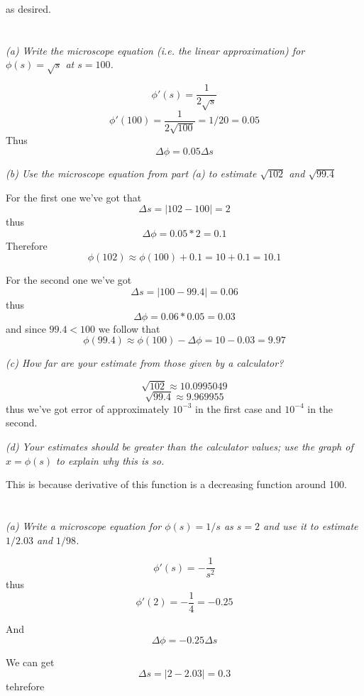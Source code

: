 \documentclass[11pt,oneside,titlepage]{book}
\begin{document}
as desired.

\section{}

\textit{(a) Write the microscope equation (i.e. the linear approximation) for
  $\phi(s) = \sqrt{s}$ at $s = 100$.}

$$\phi'(s) = \frac{1}{2 \sqrt{s}}$$
$$\phi'(100) = \frac{1}{2 \sqrt{100}} = 1/20 = 0.05$$
Thus
$$\Delta \phi = 0.05 \Delta s$$

\textit{(b) Use the microscope equation from part (a) to estimate $\sqrt{102}$ and $\sqrt{99.4}$}

For the first one we've got that
$$\Delta s = |102 - 100| = 2$$
thus
$$\Delta \phi = 0.05 * 2 = 0.1$$
Therefore
$$\phi(102) \approx \phi(100) + 0.1 = 10 + 0.1 = 10.1$$

For the second one we've got
$$\Delta s = |100 - 99.4| = 0.06$$
thus
$$\Delta \phi = 0.06 * 0.05 = 0.03$$
and since $99.4 < 100$ we follow that
$$\phi(99.4) \approx \phi(100) - \Delta \phi = 10 - 0.03 = 9.97$$

\textit{(c) How far are your estimate from those given by a calculator?}

$$\sqrt{102} \approx 10.0995049$$
$$\sqrt{99.4} \approx 9.969955$$
thus we've got  error of approximately $10^{-3}$ in the first case and $10^{-4}$ in the second.

\textit{(d) Your estimates should be greater than the calculator values; use the graph of
  $x = \phi(s)$ to explain why this is so.}

This is because derivative of this function is a  decreasing function around 100.

\section{}

\textit{(a) Write a microscope equation for $\phi(s) = 1/s$ as $s = 2$ and use it to estimate
  $1/2.03$ and $1/98$.}

$$\phi'(s) = -\frac{1}{s^2}$$
thus
$$\phi'(2) = -\frac{1}{4} = -0.25$$

And
$$\Delta \phi = -0.25 \Delta s$$

We can get
$$\Delta s = |2 - 2.03| = 0.3$$
tehrefore
$$
\end{document}
